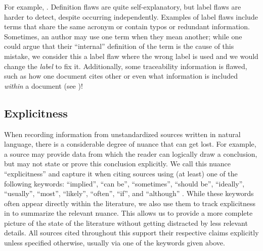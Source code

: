 

\label{label-flaw-def}
For example, . Definition flaws are quite self-explanatory, but
label flaws are harder to detect, despite occurring independently. Examples of
label flaws include terms that share the same acronym or contain typos or
redundant information. Sometimes, an author may use one term when they mean
another; while one could argue that their ``internal'' definition of the term
is the cause of this mistake, we consider this a label flaw where the wrong
label is used and we would change the \emph{label} to fix it.
\label{trace-flaw-def}%
Additionally, some traceability information is flawed, such as how one document
cites other or even what information is included \emph{within} a document
(see )!

\subsection{Explicitness}\label{explicitness}

\def\impKeywordsCode{\seeSrcCode{23dbe41}{scripts/helpers.py}{25}{54}}

When recording information from unstandardized sources written in natural
language, there is a considerable degree of nuance that can get lost. For
example, a source may provide data from which the reader can logically draw a
conclusion, but may not state or prove this conclusion explicitly.
We call this nuance ``explicitness'' and capture it when citing sources using
(at least) one of the following keywords: ``implied'',
``can be'', ``sometimes'', ``should be'', ``ideally'', ``usually'', ``most'',
``likely'', ``often'', ``if'', and ``although''%
\utd{}. While these keywords often appear directly within the literature, we
also use them to track explicitness in \ourApproachGlossary{} to summarize the
relevant nuance. This allows us to provide a more complete picture of the state
of the literature without getting distracted by less relevant details. All
sources cited throughout this \docType{} support their
respective claims explicitly unless specified otherwise, usually via one of the
keywords given above.

